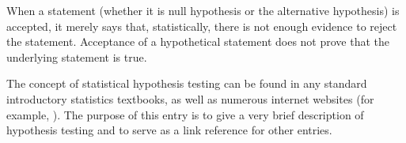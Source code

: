 \documentclass[12pt]{article}
\begin{document}
When a statement (whether it is null hypothesis or the alternative hypothesis) is accepted, it merely says that, statistically, there is not enough evidence to reject the statement.  Acceptance of a hypothetical statement does not prove that the underlying statement is true.
\par
The concept of statistical hypothesis testing can be found in any standard introductory statistics textbooks, as well as numerous internet websites (for example, ).  The purpose of this entry is to give a very brief description of hypothesis testing and to serve as a link reference for other entries.
\end{document}
